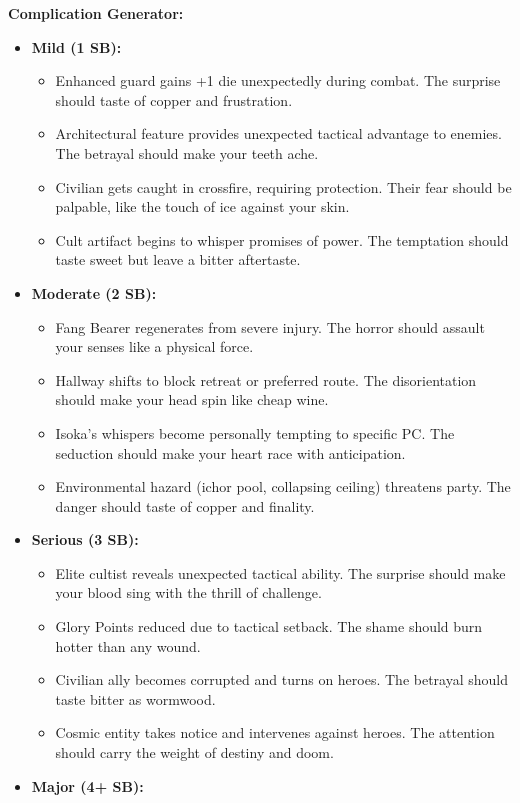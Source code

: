 \documentclass[11pt]{article}
\begin{document}
\textbf{Complication Generator:}
\begin{itemize}
\item \textbf{Mild (1 SB):} 
  \begin{itemize}
  \item Enhanced guard gains +1 die unexpectedly during combat. The surprise should taste of copper and frustration.
  \item Architectural feature provides unexpected tactical advantage to enemies. The betrayal should make your teeth ache.
  \item Civilian gets caught in crossfire, requiring protection. Their fear should be palpable, like the touch of ice against your skin.
  \item Cult artifact begins to whisper promises of power. The temptation should taste sweet but leave a bitter aftertaste.
  \end{itemize}
\item \textbf{Moderate (2 SB):}
  \begin{itemize}
  \item Fang Bearer regenerates from severe injury. The horror should assault your senses like a physical force.
  \item Hallway shifts to block retreat or preferred route. The disorientation should make your head spin like cheap wine.
  \item Isoka's whispers become personally tempting to specific PC. The seduction should make your heart race with anticipation.
  \item Environmental hazard (ichor pool, collapsing ceiling) threatens party. The danger should taste of copper and finality.
  \end{itemize}
\item \textbf{Serious (3 SB):}
  \begin{itemize}
  \item Elite cultist reveals unexpected tactical ability. The surprise should make your blood sing with the thrill of challenge.
  \item Glory Points reduced due to tactical setback. The shame should burn hotter than any wound.
  \item Civilian ally becomes corrupted and turns on heroes. The betrayal should taste bitter as wormwood.
  \item Cosmic entity takes notice and intervenes against heroes. The attention should carry the weight of destiny and doom.
  \end{itemize}
\item \textbf{Major (4+ SB):}

\end{itemize}
\end{document}
